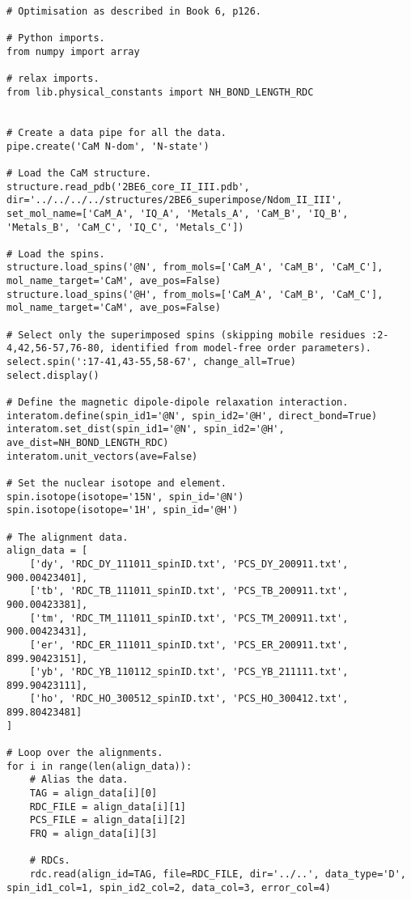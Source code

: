 \begin{lstlisting}
# Optimisation as described in Book 6, p126.

# Python imports.
from numpy import array

# relax imports.
from lib.physical_constants import NH_BOND_LENGTH_RDC


# Create a data pipe for all the data.
pipe.create('CaM N-dom', 'N-state')

# Load the CaM structure.
structure.read_pdb('2BE6_core_II_III.pdb', dir='../../../../structures/2BE6_superimpose/Ndom_II_III', set_mol_name=['CaM_A', 'IQ_A', 'Metals_A', 'CaM_B', 'IQ_B', 'Metals_B', 'CaM_C', 'IQ_C', 'Metals_C'])

# Load the spins.
structure.load_spins('@N', from_mols=['CaM_A', 'CaM_B', 'CaM_C'], mol_name_target='CaM', ave_pos=False)
structure.load_spins('@H', from_mols=['CaM_A', 'CaM_B', 'CaM_C'], mol_name_target='CaM', ave_pos=False)

# Select only the superimposed spins (skipping mobile residues :2-4,42,56-57,76-80, identified from model-free order parameters).
select.spin(':17-41,43-55,58-67', change_all=True)
select.display()

# Define the magnetic dipole-dipole relaxation interaction.
interatom.define(spin_id1='@N', spin_id2='@H', direct_bond=True)
interatom.set_dist(spin_id1='@N', spin_id2='@H', ave_dist=NH_BOND_LENGTH_RDC)
interatom.unit_vectors(ave=False)

# Set the nuclear isotope and element.
spin.isotope(isotope='15N', spin_id='@N')
spin.isotope(isotope='1H', spin_id='@H')

# The alignment data.
align_data = [
    ['dy', 'RDC_DY_111011_spinID.txt', 'PCS_DY_200911.txt', 900.00423401],
    ['tb', 'RDC_TB_111011_spinID.txt', 'PCS_TB_200911.txt', 900.00423381],
    ['tm', 'RDC_TM_111011_spinID.txt', 'PCS_TM_200911.txt', 900.00423431],
    ['er', 'RDC_ER_111011_spinID.txt', 'PCS_ER_200911.txt', 899.90423151],
    ['yb', 'RDC_YB_110112_spinID.txt', 'PCS_YB_211111.txt', 899.90423111],
    ['ho', 'RDC_HO_300512_spinID.txt', 'PCS_HO_300412.txt', 899.80423481]
]

# Loop over the alignments.
for i in range(len(align_data)):
    # Alias the data.
    TAG = align_data[i][0]
    RDC_FILE = align_data[i][1]
    PCS_FILE = align_data[i][2]
    FRQ = align_data[i][3]

    # RDCs.
    rdc.read(align_id=TAG, file=RDC_FILE, dir='../..', data_type='D', spin_id1_col=1, spin_id2_col=2, data_col=3, error_col=4)


\end{lstlisting}
